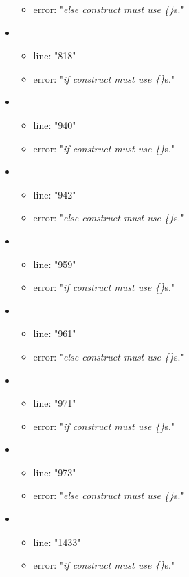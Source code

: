 \begin{itemize}
\begin{itemize}
		\item error: "\emph{else construct must use \{\}}s." 
	\end{itemize}
	\item 
	\begin{itemize} 
		\item line: "818" 
		\item error: "\emph{if construct must use \{\}}s." 
	\end{itemize}
	\item 
	\begin{itemize} 
		\item line: "940" 
		\item error: "\emph{if construct must use \{\}}s." 
	\end{itemize}
	\item 
	\begin{itemize} 
		\item line: "942" 
		\item error: "\emph{else construct must use \{\}}s." 
	\end{itemize}
	\item 
	\begin{itemize} 
		\item line: "959" 
		\item error: "\emph{if construct must use \{\}}s." 
	\end{itemize}
	\item 
	\begin{itemize} 
		\item line: "961" 
		\item error: "\emph{else construct must use \{\}}s." 
	\end{itemize}
	\item 
	\begin{itemize} 
		\item line: "971" 
		\item error: "\emph{if construct must use \{\}}s." 
	\end{itemize}
	\item 
	\begin{itemize} 
		\item line: "973" 
		\item error: "\emph{else construct must use \{\}}s." 
	\end{itemize}
	\item 
	\begin{itemize} 
		\item line: "1433" 
		\item error: "\emph{if construct must use \{\}}s." 

\end{itemize}
\end{itemize}
